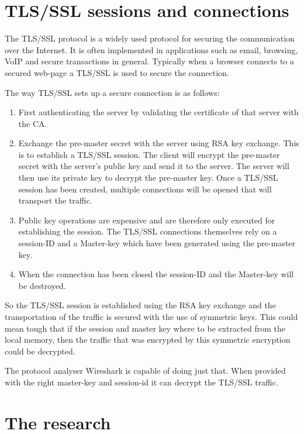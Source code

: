 \documentclass[12pt, a4paper]{report}
\begin{document}
\section{TLS/SSL sessions and connections}

The TLS/SSL protocol is a widely used protocol for securing the communication over the Internet. It is often implemented in applications such as email, browsing, VoIP and secure transactions in general. Typically when a browser connects to a secured web-page a TLS/SSL is used to secure the connection. 

The way TLS/SSL sets up a secure connection is as follows: 

\begin{enumerate}
\item First authenticating the server by validating the certificate of that server with the CA.
\item Exchange the pre-master secret with the server using RSA key exchange. This is to establish a TLS/SSL session. 
The client will encrypt the pre-master secret with the server's public key and send it to the server. The server will then use its private key to decrypt the pre-master key. Once a TLS/SSL session has been created, multiple connections will be opened that will transport the traffic.
\item Public key operations are expensive and are therefore only executed for establishing the session. The TLS/SSL connections themselves rely on a session-ID and a Master-key which have been generated using the pre-master key. 
\item When the connection has been closed the session-ID and the Master-key will be destroyed.  
\end{enumerate}

So the TLS/SSL session is established using the RSA key exchange and the transportation of the traffic is secured with the use of symmetric keys. This could mean tough that if the session and master key where to be extracted from the local memory, then the traffic that was encrypted by this symmetric encryption could be decrypted. 

The protocol analyser Wireshark is capable of doing just that. When provided with the right master-key and session-id it can decrypt the TLS/SSL traffic. 

\newpage
\section{The research}
\end{document}
